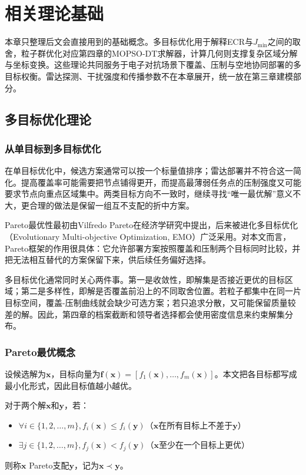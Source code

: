 \chapter{相关理论基础}\label{chap:related}\label{chap:theory}

本章只整理后文会直接用到的基础概念。多目标优化用于解释ECR与$J_{\min}$之间的取舍，粒子群优化对应第四章的MOPSO-DT求解器，计算几何则支撑复杂区域分解与坐标变换。这些理论共同服务于电子对抗场景下覆盖、压制与空地协同部署的多目标权衡。雷达探测、干扰强度和传播参数不在本章展开，统一放在第三章建模部分。

\section{多目标优化理论}

\subsection{从单目标到多目标优化}

在单目标优化中，候选方案通常可以按一个标量值排序；雷达部署并不符合这一简化。提高覆盖率可能需要把节点铺得更开，而提高最薄弱任务点的压制强度又可能要求节点向重点区域集中。两类目标方向不一致时，继续寻找“唯一最优解”意义不大，更合理的做法是保留一组互不支配的折中方案。

Pareto最优性最初由Vilfredo Pareto在经济学研究中提出，后来被进化多目标优化（Evolutionary Multi-objective Optimization, EMO）广泛采用。对本文而言，Pareto框架的作用很具体：它允许部署方案按照覆盖和压制两个目标同时比较，并把无法相互替代的方案保留下来，供后续任务偏好选择。

多目标优化通常同时关心两件事。第一是收敛性，即解集是否接近更优的目标区域；第二是多样性，即解是否覆盖前沿上的不同取舍位置。若粒子都集中在同一片目标空间，覆盖-压制曲线就会缺少可选方案；若只追求分散，又可能保留质量较差的解。因此，第四章的档案截断和领导者选择都会使用密度信息来约束解集分布。

\subsection{Pareto最优概念}

设候选解为$\mathbf{x}$，目标向量为$\mathbf{f}(\mathbf{x})=[f_1(\mathbf{x}),\ldots,f_m(\mathbf{x})]$。本文把各目标都写成最小化形式，因此目标值越小越优。

\begin{definition}[Pareto支配]
对于两个解$\mathbf{x}$和$\mathbf{y}$，若：
\begin{itemize}
    \item $\forall i \in \{1,2,\ldots,m\}, f_i(\mathbf{x}) \leq f_i(\mathbf{y})$（$\mathbf{x}$在所有目标上不差于$\mathbf{y}$）
    \item $\exists j \in \{1,2,\ldots,m\}, f_j(\mathbf{x}) < f_j(\mathbf{y})$（$\mathbf{x}$至少在一个目标上更优）
\end{itemize}
则称$\mathbf{x}$ Pareto支配$\mathbf{y}$，记为$\mathbf{x} \prec \mathbf{y}$。
\end{definition}

